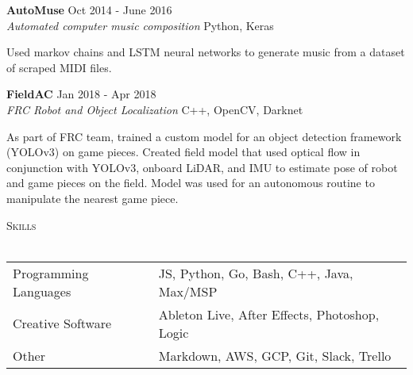 \documentclass[a4paper]{article}
\newcommand{\lineunder} {
    \vspace*{-8pt} \\
    \hspace*{-18pt} \hrulefill \\
}
\newcommand{\header} [1] {
    {\hspace*{-18pt}\vspace*{6pt} \textsc{#1}}
    \vspace*{-6pt} \lineunder
}
\begin{document}
\noindent
\textbf{AutoMuse} \hfill Oct 2014 - June 2016\\
\textit{Automated computer music composition} \hfill Python, Keras
\vspace{-10pt}
\begin{paragraph}{}
Used markov chains and LSTM neural networks to generate music from a dataset of scraped MIDI files. \\ 

\end{paragraph}

\noindent
\textbf{FieldAC} \hfill Jan 2018 - Apr 2018\\
\textit{FRC Robot and Object Localization} \hfill C++, OpenCV, Darknet\\
\vspace{-20pt}
\begin{paragraph}{}
As part of FRC team, trained a custom model for an object detection framework (YOLOv3) on game pieces. Created field model that used optical flow in conjunction with YOLOv3, onboard LiDAR, and IMU to estimate pose of robot and game pieces on the field. Model was used for an autonomous routine to manipulate the nearest game piece.\\

\end{paragraph}
\noindent
\header{Skills}

\noindent
\begin{tabular}{ l l }
	Programming Languages & JS, Python, Go, Bash, C++, Java, Max/MSP \\
	Creative Software             & Ableton Live, After Effects, Photoshop, Logic    \\
	Other                  & Markdown, AWS, GCP, Git, Slack, Trello        \\
\end{tabular}
\vspace{8mm}
\noindent
\begin{center}
\end{center}
\ 
\end{document}
